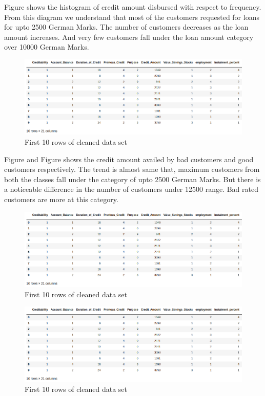 \documentclass[sigconf]{acmart}
\begin{document}
Figure shows the histogram of credit amount disbursed with respect to frequency. From this diagram we understand that most of the customers requested for loans for upto 2500 German Marks. The number of customers decreases as the loan amount increases. And very few customers fall under the loan amount category over 10000 German Marks. 

\begin{figure}[htb]
  \centering
  \includegraphics[width=1.0\columnwidth]{project/images/Figure3.png}
  \caption{First 10 rows of cleaned data set
  \cite{psu-site}}
  \label{fig:Figure3} 
\end{figure}

Figure and Figure shows the credit amount availed by bad customers and good customers respectively. The trend is almost same that, maximum customers from both the classes fall under the category of upto 2500 German Marks. But there is a noticeable difference in the number of customers under 12500 range. Bad rated customers are more at this category.

\begin{figure}[htb]
  \centering
  \includegraphics[width=1.0\columnwidth]{project/images/Figure3.png}
  \caption{First 10 rows of cleaned data set
  \cite{psu-site}}
  \label{fig:Figure3} 
\end{figure}

\begin{figure}[htb]
  \centering
  \includegraphics[width=1.0\columnwidth]{project/images/Figure3.png}
  \caption{First 10 rows of cleaned data set
  \cite{psu-site}}
  \label{fig:Figure3} 
\end{figure}
\end{document}
